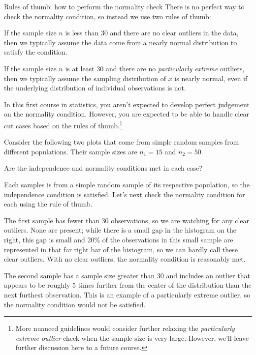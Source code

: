 \begin{onebox}{Rules of thumb:
    how to perform the normality check}
  There is no perfect way to check the normality condition,
  so instead we use two rules of thumb: %
  \begin{description}
  \setlength{\itemsep}{0mm}
  \item[$\mathbf{n < 30}$:]
      If the sample size $n$ is less than 30
      and there are no clear outliers in the data,
      then we typically assume the data come from
      a nearly normal distribution to satisfy the
      condition.
  \item[$\mathbf{n \geq 30}$:]
      If the sample size $n$ is at least 30
      and there are no \emph{particularly extreme} outliers,
      then we typically assume the sampling distribution
      of $\bar{x}$ is nearly normal, even if the underlying
      distribution of individual observations is not.
  \end{description}
\end{onebox}

In this first course in statistics, you aren't expected
to develop perfect judgement on the normality condition.
However, you are expected to be able to handle
clear cut cases based on the rules of thumb.\footnote{More
  nuanced guidelines would consider further relaxing
  the \emph{particularly extreme outlier} check when the
  sample size is very large.
  However, we'll leave further discussion here to a future course.}

\begin{examplewrap}
\begin{nexample}{Consider the following two plots
    that come from simple random samples from
    different populations.
    Their sample sizes are $n_1 = 15$ and $n_2 = 50$.
    \begin{center}
    \end{center}
    Are the independence and normality conditions met
    in each case?}
  \label{outliers_and_ss_condition_ex}%
  Each samples is from a simple random sample of its
  respective population, so the independence condition
  is satisfied.
  Let's next check the normality condition for
  each using the rule of thumb.
  
  The first sample has fewer than 30 observations,
  so we are watching for any clear outliers.
  None are present; while there is a small gap in the
  histogram on the right, this gap is small and
  20\% of the observations in this small sample
  are represented in that far right bar of the histogram,
  so we can hardly call these clear outliers.
  With no clear outliers, the normality condition
  is reasonably met.

  The second sample has a sample size greater than 30 and
  includes an outlier that appears to be roughly 5 times
  further from the center of the distribution than the
  next furthest observation.
  This is an example of a particularly extreme outlier,
  so the normality condition would not be satisfied.
\end{nexample}
\end{examplewrap}

